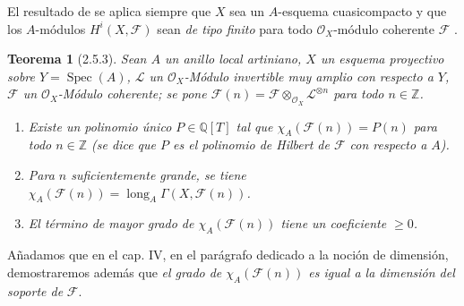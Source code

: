 \documentclass[10pt,oneside,openany]{book}
\theoremstyle{egaenv}\newtheorem*{env}{---}
\theoremstyle{egastatement}
\newtheorem*{theorem}{Teorema}
\theoremstyle{egadescription}
\renewcommand{\geq}{\geqslant}
\begin{document}
El resultado de  se aplica siempre que $X$ sea un $A$-esquema cuasicompacto y que los $A$-módulos $H^i(X,\mathcal F)$ sean \emph{de tipo finito} para todo $\mathcal O_X$-módulo coherente $\mathcal F$ .

\begin{theorem}[2.5.3]
\label{III.2.5.3-fr}
Sean $A$ un anillo local artiniano, $X$ un esquema proyectivo sobre
$Y=\operatorname{Spec}(A)$, $\mathcal L$ un $\mathcal O_X$-Módulo
invertible muy amplio con respecto a $Y$, $\mathcal F$ un
$\mathcal O_X$-Módulo coherente; se pone
$\mathcal F(n)=\mathcal F\otimes_{\mathcal O_X}\mathcal L^{\otimes n}$
para todo $n\in\mathbb Z$.
\begin{enumerate}
\item[\textup{(i)}] Existe un polinomio único $P\in\mathbb Q[T]$ tal que
$\chi_A(\mathcal F(n))=P(n)$ para todo $n\in\mathbb Z$ \textup{(se dice que $P$
es el \emph{polinomio de Hilbert} de $\mathcal F$ con respecto a $A$)}.
\item[\textup{(ii)}] Para $n$ suficientemente grande, se tiene
$\chi_A(\mathcal F(n))=\operatorname{long}_A
\Gamma(X,\mathcal F(n))$.
\item[\textup{(iii)}] El término de mayor grado de $\chi_A(\mathcal F(n))$ tiene un
coeficiente $\geq0$.
\end{enumerate}
\end{theorem}

Añadamos que en el cap. IV, en el parágrafo dedicado a la noción de
dimensión, demostraremos además que \emph{el grado de
$\chi_A(\mathcal F(n))$ es igual a la dimensión del soporte de}
$\mathcal F$.
\end{document}
